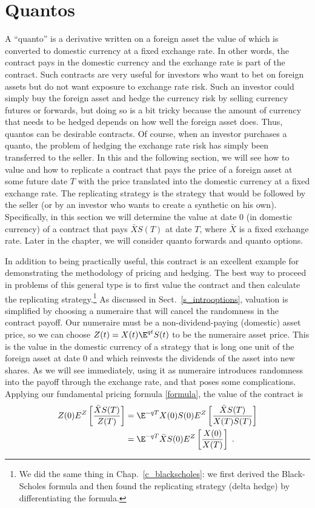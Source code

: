 \section{Quantos}\label{s_quantos}
A ``quanto''  is a derivative written on a foreign asset the value of which is converted to domestic currency at a fixed exchange rate.  In other words, the contract pays in the domestic currency and the exchange rate is part of the contract.  Such contracts are very useful for investors who want to bet on foreign assets but do not want exposure to exchange rate risk.  Such an investor could simply buy the foreign asset and hedge the currency risk by selling currency futures or forwards, but doing so is a bit tricky because the amount of currency that needs to be hedged depends on how well the foreign asset does.  Thus, quantos can be desirable contracts.  Of course, when an investor purchases a quanto, the problem of hedging the exchange rate risk has simply been transferred to the seller.  In this and the following section, we will see how to value and how to replicate a contract that pays the price of a foreign asset at some future date $T$ with the price translated into the domestic currency at a fixed exchange rate.  The replicating strategy is the strategy that would be followed by the seller (or by an investor who wants to create a synthetic  on his own).    Specifically, in this section we will determine the value  at date 0 (in domestic currency) of a contract that pays $\bar{X}S(T)$ at date $T$, where $\bar{X}$ is a fixed exchange rate.  Later in the chapter, we will consider quanto forwards and quanto options.

In addition to being practically useful, this contract is an excellent example for demonstrating the methodology of pricing and hedging.  The best way to proceed in problems of this general type is to first value the contract and then calculate the replicating strategy.\footnote{We did the same thing in Chap.~\ref{c_blackscholes}:  we first derived the Black-Scholes formula and then found the replicating strategy (delta hedge) by differentiating the formula.}  As discussed in Sect.~\ref{s_introoptions}, valuation is simplified by choosing a numeraire that will cancel the randomness in the contract payoff.  Our numeraire must be a non-dividend-paying (domestic) asset price, so we can choose $Z(t)=X(t)\E^{qt}S(t)$ to be the numeraire asset price.  This is the value in the domestic currency of a strategy that is long one unit of the foreign asset at date 0 and which reinvests the dividends of the asset into new shares.  As we will see immediately, using it as numeraire introduces randomness into the payoff through the exchange rate, and that poses some complications.  Applying our fundamental pricing formula \eqref{formula}, the value of the contract is
\begin{align}
Z(0) E^Z \left[\frac{\bar{X}S(T)}{Z(T)}\right] &= \E^{-qT}X(0)S(0)E^Z \left[\frac{\bar{X}S(T)}{X(T)S(T)}\right]\notag\\
&= \E^{-qT}\bar{X}S(0)E^Z \left[\frac{X(0)}{X(T)}\right]\;.\label{quanto}
\end{align}

